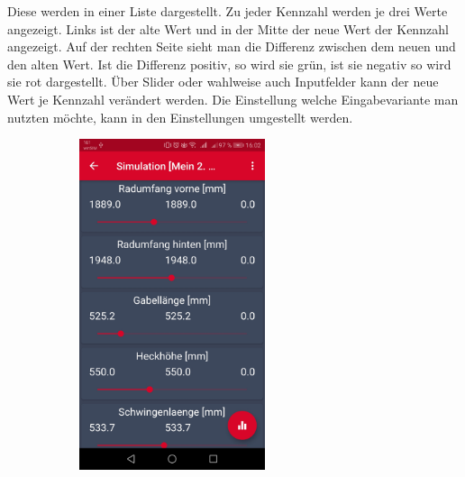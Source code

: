 Diese werden in einer Liste dargestellt. Zu jeder Kennzahl werden je drei Werte angezeigt. Links ist der alte Wert und in der Mitte der neue Wert der Kennzahl angezeigt. Auf der rechten Seite sieht man die Differenz zwischen dem neuen und den alten Wert. Ist die Differenz positiv, so wird sie grün, ist sie negativ so wird sie rot dargestellt.
Über Slider oder wahlweise auch Inputfelder kann der neue Wert je Kennzahl verändert werden. Die Einstellung welche Eingabevariante man nutzten möchte, kann in den Einstellungen umgestellt werden.
	\label{sec:edit-data}
	\begin{figure}[H]
	\begin{subfigure}[b]{0.5\textwidth}
		\centering
		\includegraphics[width=0.6\textwidth]{../include/images/funktionalitaet/dataBearbeiten}
	\end{subfigure}
	\hfill
	\begin{subfigure}[b]{0.5\textwidth}
	\centering

\end{subfigure}
\end{figure}

